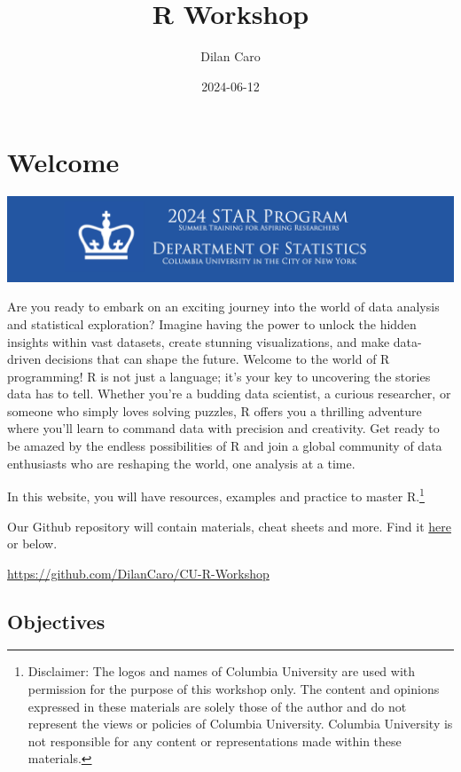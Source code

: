\documentclass[
]{book}
\title{R Workshop}
\author{Dilan Caro}
\date{2024-06-12}
\begin{document}
\maketitle

{
\setcounter{tocdepth}{1}
\tableofcontents
}
\chapter*{Welcome}\label{welcome}

\includegraphics[width=1\linewidth]{images/CU STAR}

Are you ready to embark on an exciting journey into the world of data analysis and statistical exploration? Imagine having the power to unlock the hidden insights within vast datasets, create stunning visualizations, and make data-driven decisions that can shape the future. Welcome to the world of R programming! R is not just a language; it's your key to uncovering the stories data has to tell. Whether you're a budding data scientist, a curious researcher, or someone who simply loves solving puzzles, R offers you a thrilling adventure where you'll learn to command data with precision and creativity. Get ready to be amazed by the endless possibilities of R and join a global community of data enthusiasts who are reshaping the world, one analysis at a time.

In this website, you will have resources, examples and practice to master R.\footnote{Disclaimer: The logos and names of Columbia University are used with permission for the purpose of this workshop only. The content and opinions expressed in these materials are solely those of the author and do not represent the views or policies of Columbia University. Columbia University is not responsible for any content or representations made within these materials.}

Our Github repository will contain materials, cheat sheets and more. Find it \href{https://github.com/DilanCaro/CU-R-Workshop}{here} or below.

\url{https://github.com/DilanCaro/CU-R-Workshop}

\section*{Objectives}\label{objectives}
\end{document}
